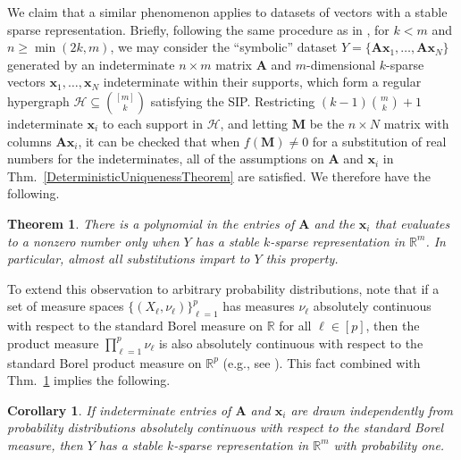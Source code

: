 \documentclass[journal, twocolumn]{IEEEtran}
\newtheorem{theorem}{Theorem}
\newtheorem{corollary}{Corollary}
\begin{document}
We claim that a similar phenomenon applies to datasets of vectors with a stable sparse representation. Briefly, following the same procedure as in \cite[Sec.~IV]{Hillar15}, for $k < m$ and $n \geq \min(2k, m)$, we may consider the ``symbolic'' dataset $Y = \{\mathbf{A}\mathbf{x}_1,\ldots,\mathbf{A} \mathbf{x}_N\}$ generated by an indeterminate $n \times m$ matrix $\mathbf{A}$ and $m$-dimensional $k$-sparse vectors $\mathbf{x}_1, \ldots, \mathbf{x}_N$ indeterminate within their supports, which form a regular hypergraph $\mathcal{H} \subseteq {[m] \choose k}$ satisfying the SIP. Restricting \mbox{$(k-1){m \choose k} + 1$} indeterminate $\mathbf{x}_i$ to each support in $\mathcal{H}$, and letting $\textbf{M}$ be the $n \times N$ matrix with columns $\mathbf{A}\mathbf{x}_i$, it can be checked that when $f(\mathbf{M}) \neq 0$ for a substitution of real numbers for the indeterminates, all of the assumptions on $\mathbf{A}$ and $\mathbf{x}_i$ in Thm.~\ref{DeterministicUniquenessTheorem} are satisfied. We therefore have the following.  %

\begin{theorem}\label{robustPolythm}
There is a polynomial in the entries of $\mathbf{A}$ and the $\mathbf{x}_i$ that evaluates to a nonzero number only when $Y$ has a stable $k$-sparse representation in $\mathbb{R}^m$. In particular, almost all substitutions impart to $Y$ this property.
\end{theorem}

To extend this observation to arbitrary probability distributions, note that if a set of measure spaces $\{(X_{\ell}, \nu_{\ell})\}_{\ell=1}^p$ has measures $\nu_{\ell}$ absolutely continuous with respect to the standard Borel measure on $\mathbb{R}$ for all $\ell \in [p]$, then the product measure $\prod_{\ell=1}^p \nu_{\ell}$ is also absolutely continuous with respect to the standard Borel product measure on $\mathbb{R}^p$ (e.g., see \cite{folland2013real}).  This fact combined with Thm.~\ref{robustPolythm} implies the following.

\begin{corollary}\label{ProbabilisticCor}
If indeterminate entries of $\mathbf{A}$ and $\mathbf{x}_i$ are drawn independently from probability distributions absolutely continuous with respect to the standard Borel measure, then $Y$ has a stable $k$-sparse representation in $\mathbb{R}^m$ with probability one.
\end{corollary}
\end{document}
